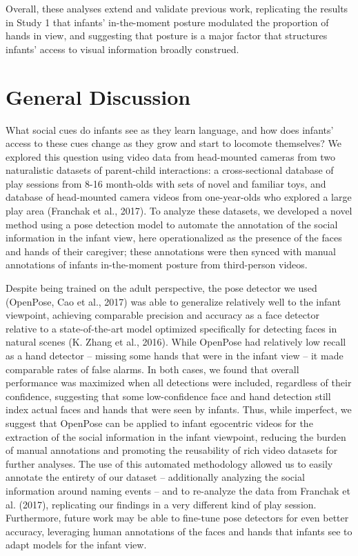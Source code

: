\documentclass[english,man]{apa6}
\begin{document}
Overall, these analyses extend and validate previous work, replicating
the results in Study 1 that infants' in-the-moment posture modulated the
proportion of hands in view, and suggesting that posture is a major
factor that structures infants' access to visual information broadly
construed.

\section{General Discussion}\label{general-discussion}

What social cues do infants see as they learn language, and how does
infants' access to these cues change as they grow and start to locomote
themselves? We explored this question using video data from head-mounted
cameras from two naturalistic datasets of parent-child interactions: a
cross-sectional database of play sessions from 8-16 month-olds with sets
of novel and familiar toys, and database of head-mounted camera videos
from one-year-olds who explored a large play area (Franchak et al.,
2017). To analyze these datasets, we developed a novel method using a
pose detection model to automate the annotation of the social
information in the infant view, here operationalized as the presence of
the faces and hands of their caregiver; these annotations were then
synced with manual annotations of infants in-the-moment posture from
third-person videos.

Despite being trained on the adult perspective, the pose detector we
used (OpenPose, Cao et al., 2017) was able to generalize relatively well
to the infant viewpoint, achieving comparable precision and accuracy as
a face detector relative to a state-of-the-art model optimized
specifically for detecting faces in natural scenes (K. Zhang et al.,
2016). While OpenPose had relatively low recall as a hand detector --
missing some hands that were in the infant view -- it made comparable
rates of false alarms. In both cases, we found that overall performance
was maximized when all detections were included, regardless of their
confidence, suggesting that some low-confidence face and hand detection
still index actual faces and hands that were seen by infants. Thus,
while imperfect, we suggest that OpenPose can be applied to infant
egocentric videos for the extraction of the social information in the
infant viewpoint, reducing the burden of manual annotations and
promoting the reusability of rich video datasets for further analyses.
The use of this automated methodology allowed us to easily annotate the
entirety of our dataset -- additionally analyzing the social information
around naming events -- and to re-analyze the data from Franchak et al.
(2017), replicating our findings in a very different kind of play
session. Furthermore, future work may be able to fine-tune pose
detectors for even better accuracy, leveraging human annotations of the
faces and hands that infants see to adapt models for the infant view.
\end{document}
